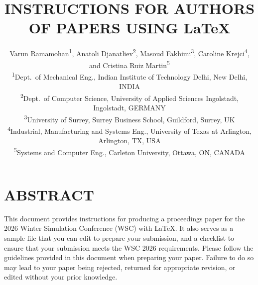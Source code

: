 \documentclass{wscpaperproc}
\theoremstyle{wsc}
\begin{document}
%
%

\title{INSTRUCTIONS FOR AUTHORS OF PAPERS USING \LaTeX}

\author{\begin{center}Varun Ramamohan\textsuperscript{1}, Anatoli Djanatliev\textsuperscript{2}, Masoud Fakhimi\textsuperscript{3}, Caroline Krejci\textsuperscript{4}, and Cristina Ruiz Martin\textsuperscript{5}\\
[11pt]
\textsuperscript{1}Dept.~of Mechanical Eng., Indian Institute of Technology Delhi, New Delhi, INDIA\\
\textsuperscript{2}Dept.~of Computer Science, University of Applied Sciences Ingolstadt, Ingolstadt, GERMANY\\
\textsuperscript{3}University of Surrey, Surrey Business School, Guildford, Surrey, UK\\
\textsuperscript{4}Industrial, Manufacturing and Systems Eng., University of Texas at Arlington, Arlington, TX, USA\\
\textsuperscript{5}Systems and Computer Eng., Carleton University, Ottawa, ON, CANADA\end{center}
}

\maketitle

\vspace{-12pt}

\section*{ABSTRACT}
This document provides instructions for producing a proceedings paper for the 2026 Winter Simulation Conference (WSC) with \LaTeX. It also serves as a sample file that you can edit to prepare your submission, and a checklist to ensure that your submission meets the WSC 2026 requirements. Please follow the guidelines provided in this document when preparing your paper. Failure to do so may lead to your paper being rejected, returned for appropriate revision, or edited without your prior knowledge.
\end{document}
